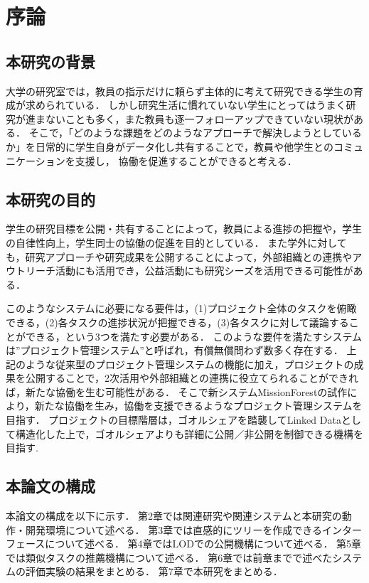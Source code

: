 \chapter{序論}
\label{chap:intro}

\section{本研究の背景}
大学の研究室では，教員の指示だけに頼らず主体的に考えて研究できる学生の育成が求められている．
しかし研究生活に慣れていない学生にとってはうまく研究が進まないことも多く，また教員も逐一フォローアップできていない現状がある．
そこで，「どのような課題をどのようなアプローチで解決しようとしているか」を日常的に学生自身がデータ化し共有することで，教員や他学生とのコミュニケーションを支援し，
協働を促進することができると考える．

\section{本研究の目的}
学生の研究目標を公開・共有することによって，教員による進捗の把握や，学生の自律性向上，学生同士の協働の促進を目的としている．
また学外に対しても，研究アプローチや研究成果を公開することによって，外部組織との連携やアウトリーチ活動にも活用でき，公益活動にも研究シーズを活用できる可能性がある．

このようなシステムに必要になる要件は，(1)プロジェクト全体のタスクを俯瞰できる，(2)各タスクの進捗状況が把握できる，(3)各タスクに対して議論することができる，という3つを満たす必要がある．
このような要件を満たすシステムは”プロジェクト管理システム”と呼ばれ，有償無償問わず数多く存在する．
上記のような従来型のプロジェクト管理システムの機能に加え，プロジェクトの成果を公開することで，2次活用や外部組織との連携に役立てられることができれば，新たな協働を生む可能性がある．
そこで新システムMissionForestの試作により，新たな協働を生み，協働を支援できるようなプロジェクト管理システムを目指す．
プロジェクトの目標階層は，ゴオルシェアを踏襲してLinked Dataとして構造化した上で，ゴオルシェアよりも詳細に公開／非公開を制御できる機構を目指す.

\section{本論文の構成}
本論文の構成を以下に示す．
第2章では関連研究や関連システムと本研究の動作・開発環境について述べる．
第3章では直感的にツリーを作成できるインターフェースについて述べる．
第4章ではLODでの公開機構について述べる．
第5章では類似タスクの推薦機構について述べる．
第6章では前章までで述べたシステムの評価実験の結果をまとめる．
第7章で本研究をまとめる．
